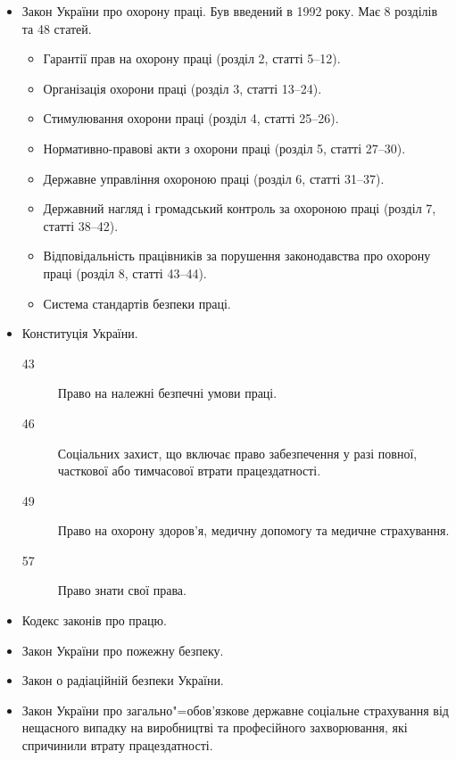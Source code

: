 \documentclass[a4paper,10pt,notitlepage,pdftex,headsepline]{scrartcl}
\begin{document}
  \begin{itemize}
    \item Закон України про охорону праці.
      Був введений в 1992 року.
      Має 8 розділів та 48 статей.
      \begin{itemize}
        \item Гарантії прав на охорону праці (розділ 2, статті 5--12).
        \item Організація охорони праці (розділ 3, статті 13--24).
        \item Стимулювання охорони праці (розділ 4, статті 25--26).
        \item Нормативно-правові акти з охорони праці (розділ 5, статті
          27--30).
        \item Державне управління охороною праці (розділ 6, статті 31--37).
        \item Державний нагляд і громадський контроль за охороною праці
          (розділ 7, статті 38--42).
        \item Відповідальність працівників за порушення законодавства про
          охорону праці (розділ 8, статті 43--44).
        \item Система стандартів безпеки праці.
      \end{itemize}
    \item Конституція України.
      \begin{description}
        \item[43] Право на належні безпечні умови праці.
        \item[46] Соціальних захист, що включає право забезпечення у разі
          повної, часткової або тимчасової втрати працездатності.
        \item[49] Право на охорону здоров’я, медичну допомогу та медичне
          страхування.
        \item[57] Право знати свої права.
      \end{description}
    \item Кодекс законів про працю.
    \item Закон України про пожежну безпеку.
    \item Закон о радіаційній безпеки України.
    \item Закон України про загально"=обов’язкове державне соціальне страхування
      від нещасного випадку на виробництві та професійного захворювання, які
      спричинили втрату працездатності.
  \end{itemize}
\end{document}
